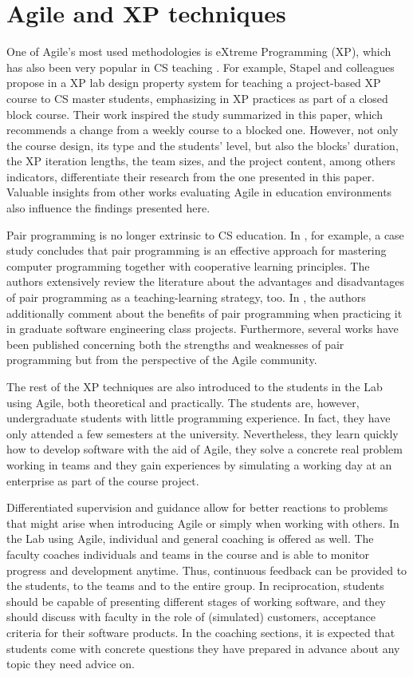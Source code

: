 \documentclass[conference]{IEEEtran}
\begin{document}
\section{Agile and XP techniques}
\label{sec:agileXP}

One of Agile's most used methodologies is eXtreme Programming (XP), which has also been very popular in CS teaching \cite{Go04,KeDi04,MuTi01,ShWi02,StLuEr08}. For example, Stapel and colleagues propose in \cite{StLuEr08} a XP lab design property system for teaching a project-based XP course to CS master students, emphasizing in XP practices as part of a closed block course. Their work inspired the study summarized in this paper, which recommends a change from a weekly course to a blocked one. However, not only the course design, its type and the students' level, but also the blocks' duration, the XP iteration lengths, the team sizes, and the project content, among others indicators, differentiate their research from the one presented in this paper. Valuable insights from other works evaluating Agile in education environments also influence the findings presented here.

Pair programming is no longer extrinsic to CS education. In \cite{MeVaGo08}, for example, a case study concludes that pair programming is an effective approach for mastering computer programming together with cooperative learning principles. The authors extensively review the literature about the advantages and disadvantages of pair programming as a teaching-learning strategy, too. In \cite{XuRa05}, the authors additionally comment about the benefits of pair programming when practicing it in graduate software engineering class projects. Furthermore, several works have been published concerning both the strengths and weaknesses of pair programming but from the perspective of the Agile community.

The rest of the XP techniques are also introduced to the students in the Lab using Agile, both theoretical and practically. The students are, however, undergraduate students with little programming experience. In fact, they have only attended a few semesters at the university. Nevertheless, they learn quickly how to develop software with the aid of Agile, they solve a concrete real problem working in teams and they gain experiences by simulating a working day at an enterprise as part of the course project. 

Differentiated supervision and guidance allow for better reactions to problems that might arise when introducing Agile or simply when working with others. In the Lab using Agile, individual and general coaching is offered as well. The faculty coaches individuals and teams in the course and is able to monitor progress and development anytime. Thus, continuous feedback can be provided to the students, to the teams and to the entire group. In reciprocation, students should be capable of presenting different stages of working software, and they should discuss with faculty in the role of (simulated) customers, acceptance criteria for their software products. In the coaching sections, it is expected that students come with concrete questions they have prepared in advance about any topic they need advice on.
\end{document}
